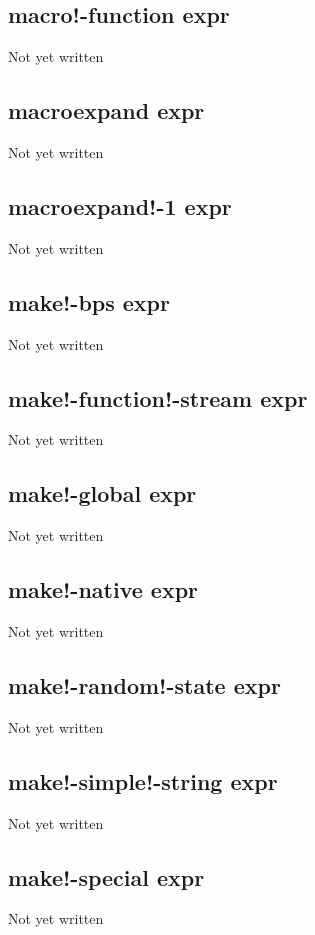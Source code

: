 \documentclass[a4paper,11pt]{article}
\begin{document}
\subsection{\ttfamily macro!-function expr}
Not yet written

\subsection{\ttfamily macroexpand expr}
Not yet written

\subsection{\ttfamily macroexpand!-1 expr}
Not yet written

\subsection{\ttfamily make!-bps expr}
Not yet written

\subsection{\ttfamily make!-function!-stream expr}
Not yet written

\subsection{\ttfamily make!-global expr}
Not yet written

\subsection{\ttfamily make!-native expr}
Not yet written

\subsection{\ttfamily make!-random!-state expr}
Not yet written

\subsection{\ttfamily make!-simple!-string expr}
Not yet written

\subsection{\ttfamily make!-special expr}
Not yet written
\end{document}
